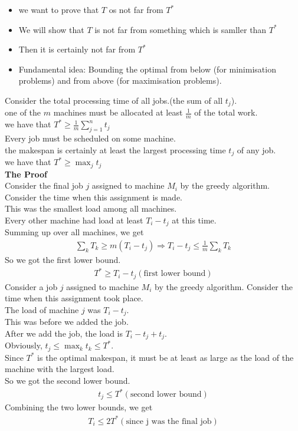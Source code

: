\documentclass[onecolumn]{report}
\begin{document}
\begin{itemize}
    \item we want to prove that $T$ os not far from $T^*$
    \item We will show that $T$ is not far from something which is samller than $T^*$
    \item Then it is certainly not far from $T^*$
    \item Fundamental idea: Bounding the optimal from below (for minimisation problems) and from above (for maximisation problems).
\end{itemize}
Consider the total processing time of all jobs.(the sum of all $t_j$).\\
\indent one of the $m$ machines must be allocated at least $\frac{1}{m}$ of the total work.\\
\indent we have that $T^* \geq \frac{1}{m} \sum_{j=1}^n t_j$\\
Every job must be scheduled on some machine.\\
\indent the makespan is certainly at least the largest processing time $t_j$ of any job.\\
\indent we have that $T^* \geq \max_j t_j$\\

\noindent
\textbf{The Proof}\\
\indent Consider the final job $j$ assigned to machine $M_i$ by the greedy algorithm. Consider the time when this assignment is made.\\
\indent This was the smallest load among all machines.\\
\indent Every other machine had load at least $T_i-t_j$ at this time.\\
\indent Summing up over all machines, we get 
\begin{align*}
    \sum_k T_k \geq m(T_i-t_j) \Rightarrow T_i-t_j \leq \frac{1}{m} \sum_k T_k
\end{align*}
\indent So we got the first lower bound.\\
\begin{align*}
    T^* \geq T_i - t_j (\text{first lower bound})
\end{align*}
Consider a job $j$ assigned to machine $M_i$ by the greedy algorithm. Consider the time when this assignment took place.\\
\indent The load of machine $j$ was $T_i-t_j$.\\
\indent This was before we added the job.\\
\indent After we add the job, the load is $T_i-t_j+t_j$.\\
\indent Obviously, $t_j \leq \max_k t_k \leq T^*$.\\
\indent Since $T^*$ is the optimal makespan, it must be at least as large as the load of the machine with the largest load.\\
\indent So we got the second lower bound.\\
\begin{align*}
    t_j \leq T^* (\text{second lower bound})
\end{align*}
\indent Combining the two lower bounds, we get
\begin{align*}
    T_i \leq 2T^* (\text{since j was the final job})
\end{align*}
\end{document}
